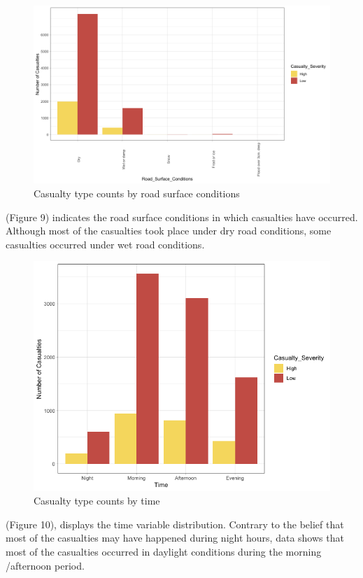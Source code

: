 \documentclass[
  a4paper,
]{article}
\begin{document}
\begin{figure}[h!]

{\centering \includegraphics[width=0.75\linewidth]{rs} 

}

\caption{Casualty type counts by road surface conditions}\label{fig:unnamed-chunk-10}
\end{figure}

\newpage

(Figure 9) indicates the road surface conditions in which casualties
have occurred. Although most of the casualties took place under dry road
conditions, some casualties occurred under wet road conditions.

\begin{figure}[h!]

{\centering \includegraphics[width=0.75\linewidth]{time} 

}

\caption{Casualty type counts by time}\label{fig:unnamed-chunk-11}
\end{figure}

(Figure 10), displays the time variable distribution. Contrary to the
belief that most of the casualties may have happened during night hours,
data shows that most of the casualties occurred in daylight conditions
during the morning /afternoon period.
\end{document}
